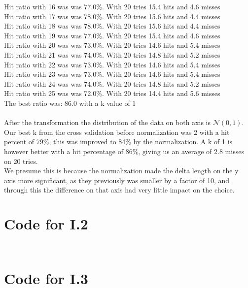 \documentclass{article}
\begin{document}
Hit ratio with 16 was  {\color{green}was 77.0\%}. With 20 tries 15.4 hits and 4.6 misses\\
Hit ratio with 17 was  {\color{green}was 78.0\%}. With 20 tries 15.6 hits and 4.4 misses\\
Hit ratio with 18 was  {\color{green}was 78.0\%}. With 20 tries 15.6 hits and 4.4 misses\\
Hit ratio with 19 was  {\color{green}was 77.0\%}. With 20 tries 15.4 hits and 4.6 misses\\
Hit ratio with 20 was  {\color{green}was 73.0\%}. With 20 tries 14.6 hits and 5.4 misses\\
Hit ratio with 21 was  {\color{green}was 74.0\%}. With 20 tries 14.8 hits and 5.2 misses\\
Hit ratio with 22 was  {\color{green}was 73.0\%}. With 20 tries 14.6 hits and 5.4 misses\\
Hit ratio with 23 was  {\color{green}was 73.0\%}. With 20 tries 14.6 hits and 5.4 misses\\
Hit ratio with 24 was  {\color{green}was 74.0\%}. With 20 tries 14.8 hits and 5.2 misses\\
Hit ratio with 25 was  {\color{green}was 72.0\%}. With 20 tries 14.4 hits and 5.6 misses\\
The best ratio was: 86.0 with a k value of 1\\\\
After the transformation the distribution of the data on both axis is $\mathscr{N}(0,1)$. Our best k from the 
cross validation before normalization was 2 with a hit percent of 79\%, this was improved to 84\% by the normalization. 
A k of 1 is however better with a hit percentage of 86\%, giving us an average of 2.8 misses on 20 tries.\\
We presume this is because the normalization made the delta length on the y axis more significant, as they previously was smaller by a factor of 10,
and through this the difference on that axis had very little impact on the choice.

\newpage
\begin{appendices}

\section{Code for I.2}

\inputminted{matlab}{part1/i22john.m}

\inputminted{matlab}{part1/rotationm.m}

\section{Code for I.3}

\inputminted{python}{part2/neighborJohn.py}

\end{appendices}
\end{document}
